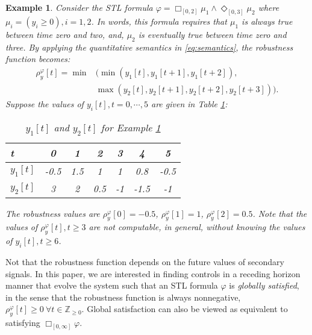 \documentclass[letterpaper, 10 pt, conference]{ieeeconf}
\newtheorem{example}{Example}
\begin{document}
\begin{example}
\label{example:system}
Consider the STL formula $\varphi=\Box_{[0,2]} \mu_1 \wedge \Diamond_{[0,3]} \mu_2$ where $\mu_i=(y_i \geq 0), i=1,2$. In words, this formula requires that $\mu_1$ is always true between time zero and two, \emph{and}, $\mu_2$ is eventually true between time zero and three. By applying the quantitative semantics in \eqref{eq:semantics}, the robustness function becomes: 
\begin{equation*}
\begin{split}
\rho_y^\varphi[t]=\min & (\min (y_1[t],y_1[t+1],y_1[t+2]), \\ & \max (y_2[t],y_2[t+1],y_2[t+2],y_2[t+3])).
\end{split}
\end{equation*}
Suppose the values of $y_i[t],t=0, \cdots, 5$ are given in Table \ref{table:signals}:
\begin{table}[H]
\begin{center}
   \caption{$y_1[t]$ and $y_2[t]$ for Example \ref{example:system}}
          \label{table:signals}

  \begin{tabular}{ | l | *{6}{c}  | }
    \hline
    t & 0 & 1 & 2 & 3 & 4 & 5 \\ \hline
    $y_1[t]$ & -0.5 & 1.5 & 1 & 1 & 0.8 & -0.5 \\ \hline
    $y_2[t]$ & 3 & 2 & 0.5 & -1 & -1.5 & -1 \\
    \hline
  \end{tabular}
   \end{center}

\end{table}
The robustness values are $\rho_y^\varphi[0]=-0.5$, $\rho_y^\varphi[1]=1$, $\rho_y^\varphi[2]=0.5$. Note that the values of $\rho_y^\varphi[t],t \geq 3$ are not computable, in general, without knowing the values of $y_i[t], t \geq 6$.

\endproof



\end{example}

Not that the robustness function depends on the future values of secondary signals. In this paper, we are interested in finding controls in a receding horizon manner that evolve the system such that an STL formula $\varphi$ is \emph{globally satisfied}, in the sense that the robustness function is always nonnegative, $\rho_y^\varphi[t] \geq 0 ~ \forall t \in \mathbb{Z}_{\geq 0}$. Global satisfaction can also be viewed as equivalent to satisfying ${\Box}_{[0,\infty]} \varphi$. 
\end{document}
